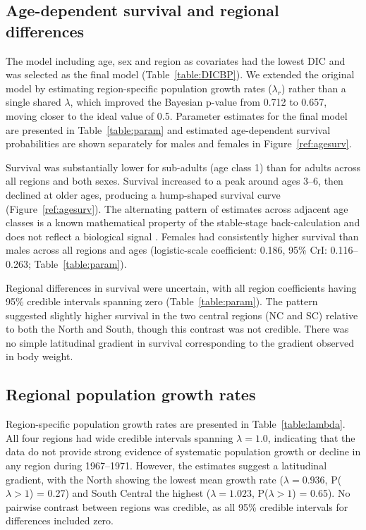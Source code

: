 \documentclass[12pt,a4paper,final,abstract=true,headings=small]{scrartcl}
\begin{document}




\subsection*{Age-dependent survival and regional differences}

The model including age, sex and region as covariates had the lowest DIC and was selected as the final model (Table~\ref{table:DICBP}). We extended the original model by estimating region-specific population growth rates ($\lambda_r$) rather than a single shared $\lambda$, which improved the Bayesian p-value from 0.712 to 0.657, moving closer to the ideal value of 0.5. Parameter estimates for the final model are presented in Table~\ref{table:param} and estimated age-dependent survival probabilities are shown separately for males and females in Figure~\ref{ref:agesurv}.

Survival was substantially lower for sub-adults (age class 1) than for adults across all regions and both sexes. Survival increased to a peak around ages 3--6, then declined at older ages, producing a hump-shaped survival curve (Figure~\ref{ref:agesurv}). The alternating pattern of estimates across adjacent age classes is a known mathematical property of the stable-stage back-calculation and does not reflect a biological signal \citep{skellyFlexibleBayesianApproach}. Females had consistently higher survival than males across all regions and ages (logistic-scale coefficient: 0.186, 95\% CrI: 0.116--0.263; Table~\ref{table:param}).

Regional differences in survival were uncertain, with all region coefficients having 95\% credible intervals spanning zero (Table~\ref{table:param}). The pattern suggested slightly higher survival in the two central regions (NC and SC) relative to both the North and South, though this contrast was not credible. There was no simple latitudinal gradient in survival corresponding to the gradient observed in body weight.

\subsection*{Regional population growth rates}

Region-specific population growth rates are presented in Table~\ref{table:lambda}. All four regions had wide credible intervals spanning $\lambda = 1.0$, indicating that the data do not provide strong evidence of systematic population growth or decline in any region during 1967--1971. However, the estimates suggest a latitudinal gradient, with the North showing the lowest mean growth rate ($\lambda = 0.936$, P($\lambda > 1$) = 0.27) and South Central the highest ($\lambda = 1.023$, P($\lambda > 1$) = 0.65).  No pairwise contrast between regions was credible, as all 95\% credible intervals for differences included zero.
\end{document}
